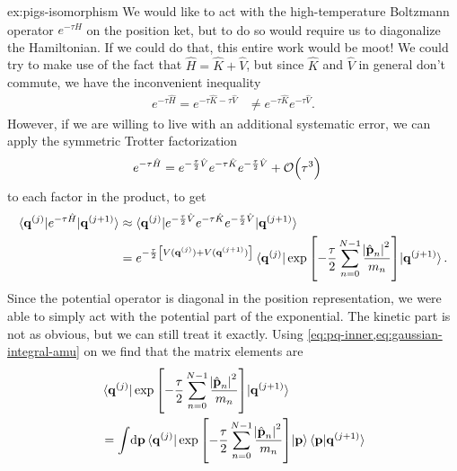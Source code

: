 \begin{DefAnswer}{ex:pigs-isomorphism}
	We would like to act with the high-temperature Boltzmann operator $e^{-\tau \hat{H}}$ on the position ket, but to do so would require us to diagonalize the Hamiltonian.
	If we could do that, this entire work would be moot!
	We could try to make use of the fact that $\hat{H} = \hat{K} + \hat{V}$, but since $\hat{K}$ and $\hat{V}$ in general don't commute, we have the inconvenient inequality
	\begin{align}
		e^{-\tau \hat{H}}
		= e^{-\tau \hat{K} - \tau \hat{V}}
		&\ne e^{-\tau \hat{K}} e^{-\tau \hat{V}}.
	\end{align}
	However, if we are willing to live with an additional systematic error, we can apply the symmetric Trotter factorization~\cite{schmidt1995high}
	\begin{align}
		e^{-\tau \hat{H}}
		&= e^{-\frac{\tau}{2} \hat{V}} e^{-\tau \hat{K}} e^{-\frac{\tau}{2} \hat{V}} + \mathcal{O}\!\left( \tau^3 \right)
	\end{align}
	to each factor in the product, to get
	\begin{subequations}
	\begin{align}
		\braket{\bm{\mathbf{q}}^{(j)} | e^{-\tau \hat{H}} | \bm{\mathbf{q}}^{(j+1)}}
		&\approx \braket{
			\bm{\mathbf{q}}^{(j)} |
			e^{-\frac{\tau}{2} \hat{V}} e^{-\tau \hat{K}} e^{-\frac{\tau}{2} \hat{V}} |
			\bm{\mathbf{q}}^{(j+1)}
		} \\
		&= e^{-\frac{\tau}{2} \left[ V(\bm{\mathbf{q}}^{(j)}) + V(\bm{\mathbf{q}}^{(j+1)}) \right]}
			\braket{
				\bm{\mathbf{q}}^{(j)} |
				\exp{\left[ -\frac{\tau}{2} \sum_{n=0}^{N-1} \frac{\abs{\hat{\bm{\mathbf{p}}}_n}^2}{m_n} \right]} |
				\bm{\mathbf{q}}^{(j+1)}
			}.
	\end{align}
	\end{subequations}
	Since the potential operator is diagonal in the position representation, we were able to simply act with the potential part of the exponential.
	The kinetic part is not as obvious, but we can still treat it exactly.
	Using \cref{eq:pq-inner,eq:gaussian-integral-amu} on  we find that the matrix elements are
	\begin{subequations}
	\begin{align}
		& \braket{
			\vec{q}\bead{j} |
			\expb{-\frac{\tau}{2} \sum_{n=0}^{N-1} \frac{\abs{\hat{\vec{p}}_n}^2}{m_n}} |
			\vec{q}\bead{j+1}
		} \notag \\
		&= \int\! \dif \vec{p}
				\braket{
					\vec{q}\bead{j} |
					\expb{-\frac{\tau}{2} \sum_{n=0}^{N-1} \frac{\abs{\hat{\vec{p}}_n}^2}{m_n}} |
					\vec{p}
				}
				\braket{\vec{p} | \vec{q}\bead{j+1}} \\

\end{align}
\end{subequations}
\end{DefAnswer}
